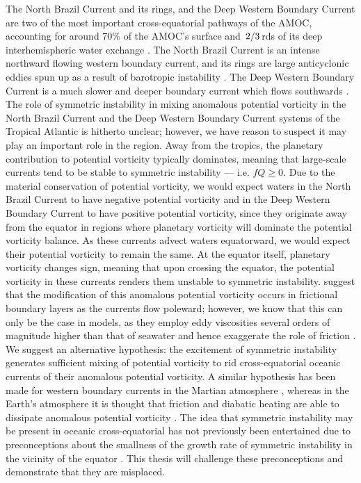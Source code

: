 
The North Brazil Current and its rings, and the Deep Western Boundary Current are two of the most important cross-equatorial pathways of the AMOC, accounting for around 70\% of the AMOC's surface \citep{Fratantoni2000} and $\flatfrac{2}{3}$rds of its deep interhemispheric water exchange \citep{Richardson1999, Bower2019}. The North Brazil Current is an intense northward flowing western boundary current, and its rings are large anticyclonic eddies spun up as a result of barotropic instability \citep{Johns1998,Castelao2011}. The Deep Western Boundary Current is a much slower and deeper boundary current which flows southwards \citep{Schott2005}. The role of symmetric instability in mixing anomalous potential vorticity in the North Brazil Current and the Deep Western Boundary Current systems of the Tropical Atlantic is hitherto unclear; however, we have reason to suspect it may play an important role in the region. Away from the tropics, the planetary contribution to potential vorticity typically dominates, meaning that large-scale currents tend to be stable to symmetric instability --- i.e. $fQ \geq 0$. Due to the material conservation of potential vorticity, we would expect waters in the North Brazil Current to have negative potential vorticity and in the Deep Western Boundary Current to have positive potential vorticity, since they originate away from the equator in regions where planetary vorticity will dominate the potential vorticity balance. As these currents advect waters equatorward, we would expect their potential vorticity to remain the same. At the equator itself, planetary vorticity changes sign, meaning that upon crossing the equator, the potential vorticity in these currents renders them unstable to symmetric instability. \citet{Edwards1998I, Edwards1998II} suggest that the modification of this anomalous potential vorticity occurs in frictional boundary layers as the currents flow poleward; however, we know that this can only be the case in models, as they employ eddy viscosities several orders of magnitude higher than that of seawater and hence exaggerate the role of friction \citep{Akuetevi2015}. We suggest an alternative hypothesis: the excitement of symmetric instability generates sufficient mixing of potential vorticity to rid cross-equatorial oceanic currents of their anomalous potential vorticity. A similar hypothesis has been made for western boundary currents in the Martian atmosphere \citep{Joshi1994}, whereas in the Earth's atmosphere it is thought that friction and diabatic heating are able to dissipate anomalous potential vorticity \citep{Rodwell1995}. The idea that symmetric instability may be present in oceanic cross-equatorial has not previously been entertained due to preconceptions about the smallness of the growth rate of symmetric instability in the vicinity of the equator \citep{Edwards1998I, Haine1998}. This thesis will challenge these preconceptions and demonstrate that they are misplaced.

